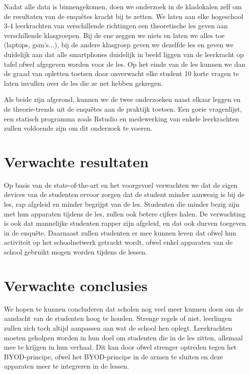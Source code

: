\documentclass[fleqn,10pt]{voorstel}
\begin{document}
Nadat alle data is binnengekomen, doen we onderzoek in de klaslokalen zelf om de resultaten van de enquêtes kracht bij te zetten. We laten aan elke hogeschool 3-4 leerkrachten van verschillende richtingen een theoretische les geven aan verschillende klasgroepen. Bij de ene zeggen we niets en laten we alles toe (laptops, gsm's...), bij de andere klasgroep geven we dezelfde les en geven we duidelijk aan dat alle smartphones duidelijk in beeld liggen van de leerkracht op tafel ofwel afgegeven worden voor de les. Op het einde van de les kunnen we dan de graad van opletten toetsen door onverwacht elke student 10 korte vragen te laten invullen over de les die ze net hebben gekregen.  

Als beide zijn afgerond, kunnen we de twee onderzoeken naast elkaar leggen en de theorie-trends uit de enquêtes aan de praktijk toetsen. Een goeie vragenlijst, een statisch programma zoals Rstudio en medewerking van enkele leerkrachten zullen voldoende zijn om dit onderzoek te voeren.

\section{Verwachte resultaten}
\label{sec:verwachte_resultaten}

Op basis van de state-of-the-art en het voorgevoel verwachten we dat de eigen devices van de studenten ervoor zorgen dat de student minder aanwezig is bij de les, rap afgeleid en minder begrijpt van de les. Studenten die minder bezig zijn met hun apparaten tijdens de les, zullen ook betere cijfers halen. De verwachting is ook dat mannelijke studenten rapper zijn afgeleid, en dat ook durven toegeven in de enquête. Daarnaast zullen studenten er mee kunnen leven dat ofwel hun activiteit op het schoolnetwerk getrackt wordt, ofwel enkel apparaten van de school gebruikt mogen worden tijdens de lessen.

\section{Verwachte conclusies}
\label{sec:verwachte_conclusies}

We hopen te kunnen concluderen dat scholen nog veel meer kunnen doen om de aandacht van de studenten hoog te houden. Strenge regels of niet, leerlingen zullen zich toch altijd aanpassen aan wat de school hen oplegt. Leerkrachten moeten geholpen worden in hun doel om studenten die in de les zitten, allemaal mee te krijgen in hun verhaal. Dit kan door ofwel strenger optreden tegen het BYOD-principe, ofwel het BYOD-principe in de armen te sluiten en deze apparaten meer te integreren in de lessen.   
\end{document}

